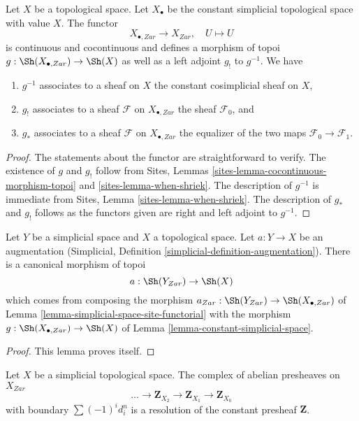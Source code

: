 \begin{lemma}
\label{lemma-constant-simplicial-space}
Let $X$ be a topological space. Let $X_\bullet$ be the constant
simplicial topological space with value $X$. The functor
$$
X_{\bullet, Zar} \longrightarrow X_{Zar},\quad
U \longmapsto U
$$
is continuous and cocontinuous and defines a morphism of
topoi $g : \Sh(X_{\bullet, Zar}) \to \Sh(X)$ as well as a left adjoint
$g_!$ to $g^{-1}$. We have
\begin{enumerate}
\item $g^{-1}$ associates to a sheaf on $X$ the constant cosimplicial
sheaf on $X$,
\item $g_!$ associates to a sheaf $\mathcal{F}$ on $X_{\bullet, Zar}$ the
sheaf $\mathcal{F}_0$, and
\item $g_*$ associates to a sheaf $\mathcal{F}$ on $X_{\bullet, Zar}$ the
equalizer of the two maps $\mathcal{F}_0 \to \mathcal{F}_1$.
\end{enumerate}
\end{lemma}

\begin{proof}
The statements about the functor are straightforward to verify.
The existence of $g$ and $g_!$ follow from
Sites, Lemmas \ref{sites-lemma-cocontinuous-morphism-topoi} and
\ref{sites-lemma-when-shriek}. The description of
$g^{-1}$ is immediate from Sites, Lemma \ref{sites-lemma-when-shriek}.
The description of $g_*$ and $g_!$ follows as the functors given are
right and left adjoint to $g^{-1}$.
\end{proof}

\begin{lemma}
\label{lemma-augmentation}
Let $Y$ be a simplicial space and $X$ a topological space.
Let $a : Y \to X$ be an augmentation
(Simplicial, Definition \ref{simplicial-definition-augmentation}).
There is a canonical morphism of topoi
$$
a : \Sh(Y_{Zar}) \to \Sh(X)
$$
which comes from composing the morphism
$a_{Zar} : \Sh(Y_{Zar}) \to \Sh(X_{\bullet, Zar})$ of
Lemma \ref{lemma-simplicial-space-site-functorial}
with the morphism $g : \Sh(X_{\bullet, Zar}) \to \Sh(X)$ of
Lemma \ref{lemma-constant-simplicial-space}.
\end{lemma}

\begin{proof}
This lemma proves itself.
\end{proof}

\begin{lemma}
\label{lemma-simplicial-resolution-Z}
Let $X$ be a simplicial topological space. The complex of
abelian presheaves on $X_{Zar}$
$$
\ldots \to \mathbf{Z}_{X_2} \to \mathbf{Z}_{X_1} \to \mathbf{Z}_{X_0}
$$
with boundary $\sum (-1)^i d^n_i$ is a resolution
of the constant presheaf $\mathbf{Z}$.
\end{lemma}

